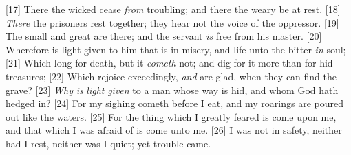 [17] \textcolor[cmyk]{0.99998,1,0,0}{There the wicked cease \emph{from} troubling; and there the weary be at rest.}
[18] \textcolor[cmyk]{0.99998,1,0,0}{\emph{There} the prisoners rest together; they hear not the voice of the oppressor.}
[19] \textcolor[cmyk]{0.99998,1,0,0}{The small and great are there; and the servant \emph{is} free from his master.}
[20] \textcolor[cmyk]{0.99998,1,0,0}{Wherefore is light given to him that is in misery, and life unto the bitter \emph{in} soul;}
[21] \textcolor[cmyk]{0.99998,1,0,0}{Which long for death, but it \emph{cometh} not; and dig for it more than for hid treasures;}
[22] \textcolor[cmyk]{0.99998,1,0,0}{Which rejoice exceedingly, \emph{and} are glad, when they can find the grave?}
[23] \textcolor[cmyk]{0.99998,1,0,0}{\emph{Why} \emph{is} \emph{light} \emph{given} to a man whose way is hid, and whom God hath hedged in?}
[24] \textcolor[cmyk]{0.99998,1,0,0}{For my sighing cometh before I eat, and my roarings are poured out like the waters.}
[25] \textcolor[cmyk]{0.99998,1,0,0}{For the thing which I greatly feared is come upon me, and that which I was afraid of is come unto me.}
[26] \textcolor[cmyk]{0.99998,1,0,0}{I was not in safety, neither had I rest, neither was I quiet; yet trouble came.}